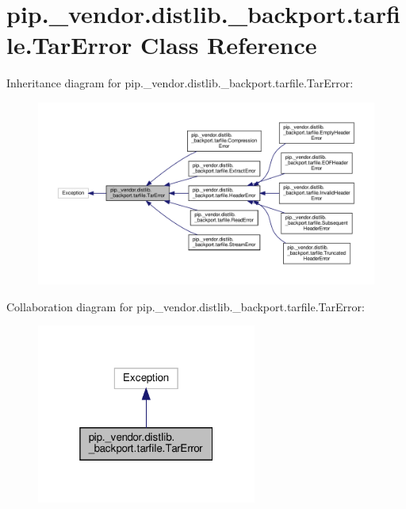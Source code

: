 \hypertarget{classpip_1_1__vendor_1_1distlib_1_1__backport_1_1tarfile_1_1TarError}{}\section{pip.\+\_\+vendor.\+distlib.\+\_\+backport.\+tarfile.\+Tar\+Error Class Reference}
\label{classpip_1_1__vendor_1_1distlib_1_1__backport_1_1tarfile_1_1TarError}


Inheritance diagram for pip.\+\_\+vendor.\+distlib.\+\_\+backport.\+tarfile.\+Tar\+Error\+:
\nopagebreak
\begin{figure}[H]
\begin{center}
\leavevmode
\includegraphics[width=350pt]{classpip_1_1__vendor_1_1distlib_1_1__backport_1_1tarfile_1_1TarError__inherit__graph}
\end{center}
\end{figure}


Collaboration diagram for pip.\+\_\+vendor.\+distlib.\+\_\+backport.\+tarfile.\+Tar\+Error\+:
\nopagebreak
\begin{figure}[H]
\begin{center}
\leavevmode
\includegraphics[width=205pt]{classpip_1_1__vendor_1_1distlib_1_1__backport_1_1tarfile_1_1TarError__coll__graph}
\end{center}
\end{figure}


